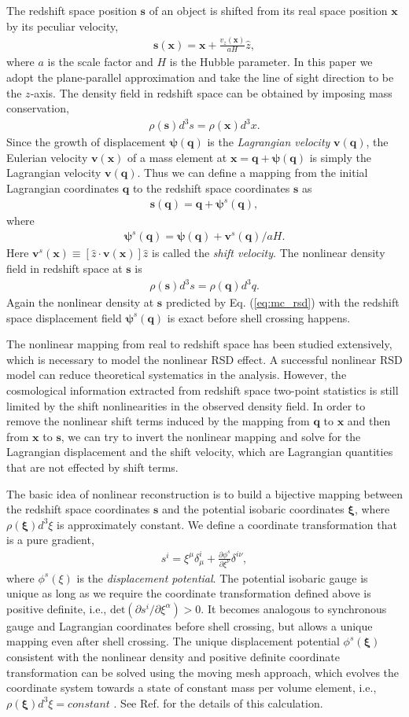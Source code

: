 \documentclass[aps,prx,twocolumn,superscriptaddress,groupedaddress,nofootinbib,amsfont]{revtex4}  %
\newcommand{\mr}{\mathrm}
\newcommand{\bea}{\begin{eqnarray}}
\newcommand{\eea}{\end{eqnarray}}
\newcommand{\bmp}{\bm{\psi}}
\newcommand{\bmv}{\bm{v}}
\newcommand{\bmx}{\bm{x}}
\newcommand{\bms}{\bm{s}}
\newcommand{\bmq}{\bm{q}}
\newcommand{\bmxi}{\bm{\xi}}
\begin{document}
The redshift space position $\bms$ of an object is shifted from its real space 
position $\bmx$ by its peculiar velocity,
\bea
\bms(\bmx)=\bmx+\frac{v_z(\bmx)}{aH}\hat{z},
\eea
where $a$ is the scale factor and $H$ is the Hubble parameter. In this paper 
we adopt the plane-parallel approximation and take the line of sight direction 
to be the $z$-axis. The density field in redshift space can be obtained by 
imposing mass conservation,
\bea
\rho(\bms)d^3s=\rho(\bmx)d^3x.
\eea
Since the growth of displacement $\bmp(\bmq)$ is the {\it Lagrangian velocity}
$\bmv(\bmq)$, the Eulerian velocity $\bmv(\bmx)$ of a mass element at 
$\bmx=\bmq+\bmp(\bmq)$ is simply the Lagrangian velocity $\bmv(\bmq)$.
Thus we can define a mapping from the initial Lagrangian coordinates $\bmq$ to 
the redshift space coordinates $\bms$ as
\bea
\bms(\bmq)=\bmq+\bmp^s(\bmq),
\eea
where
\bea
\bmp^s(\bmq)=\bmp(\bmq)+{\bmv^s(\bmq)}/{aH}.
\eea
Here $\bmv^s(\bmx)\equiv[\hat{z}\cdot\bmv(\bmx)]\hat{z}$ is called the {\it shift velocity}.
The nonlinear density field in redshift space at $\bms$ is 
\bea
\label{eq:mc_rsd}
\rho(\bms)d^3s=\rho(\bmq)d^3q.
\eea
Again the nonlinear density at $\bms$ predicted by Eq. (\ref{eq:mc_rsd})
with the redshift space displacement field $\bmp^s(\bmq)$ is exact before shell
crossing happens.

The nonlinear mapping from real to redshift space has been studied extensively,
which is necessary to model the nonlinear RSD effect. A successful nonlinear 
RSD model can reduce theoretical systematics in the analysis. However, the 
cosmological information extracted from redshift space two-point statistics 
is still limited by the shift nonlinearities in the observed density field. 
In order to remove the nonlinear shift terms induced by the mapping from $\bmq$
to $\bmx$ and then from $\bmx$ to $\bms$, we can try to invert the nonlinear 
mapping and solve for the Lagrangian displacement and the shift velocity, which
are Lagrangian quantities that are not effected by shift terms.

The basic idea of nonlinear reconstruction is to build a bijective mapping between the redshift space coordinates $\bms$ and the potential isobaric coordinates $\bmxi$, where $\rho(\bmxi)d^3\xi$ is approximately constant.
We define a coordinate transformation that is a pure gradient,
\bea
s^i=\xi^{\mu}\delta^i_{\mu}+\frac{\partial\phi^s}{\partial\xi^{\nu}}\delta^{i\nu},
\eea
where $\phi^s(\xi)$ is the {\it displacement potential}. 
The potential isobaric gauge is unique as long as we require the coordinate 
transformation defined above is positive definite, i.e., $\mr{det}(\partial s^i/\partial\xi^{\alpha})>0$. 
It becomes analogous to synchronous gauge and Lagrangian coordinates before 
shell crossing, but allows a unique mapping even after shell crossing.
The unique displacement potential $\phi^s(\bmxi)$ consistent with the nonlinear
density and positive definite coordinate transformation can be solved using
the moving mesh approach, which evolves the coordinate system towards a state 
of constant mass per volume element, i.e., $\rho(\bmxi)d^3\xi=constant$
\cite{1995ApJS..100..269P,1998ApJS..115...19P}.
See Ref. \cite{2016HMZ} for the details of this calculation.
\end{document}
